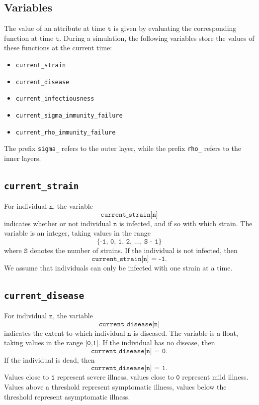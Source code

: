 \documentclass[10pt,letterpaper]{article}
\begin{document}
\subsection*{Variables}
The value of an attribute at time $\texttt{t}$ is given by evaluating the corresponding function at time $\texttt{t}$. During a simulation, the following variables store the values of these functions at the current time:
\begin{itemize}
\item \texttt{current{\_}strain}
\item \texttt{current{\_}disease}
\item \texttt{current{\_}infectiousness}
\item \texttt{current{\_}sigma{\_}immunity{\_}failure}
\item \texttt{current{\_}rho{\_}immunity{\_}failure}
\end{itemize}
The prefix \texttt{sigma{\_}} refers to the outer layer, while the prefix \texttt{rho{\_}} refers to the inner layers.

\subsection*{\texttt{current{\_}strain}}
For individual $\texttt{n}$, the variable $$\texttt{current{\_}strain[n]}$$ indicates whether or not individual $\texttt{n}$ is infected, and if so with which strain. The variable is an integer, taking values in the range $$\texttt{\{-1, 0, 1, 2, \ldots, S - 1\}}$$ where $\texttt{S}$ denotes the number of strains. If the individual is not infected, then $$\texttt{current{\_}strain[n] = -1}.$$ We assume that individuals can only be infected with one strain at a time.

\subsection*{\texttt{current{\_}disease}}
For individual $\texttt{n}$, the variable $$\texttt{current{\_}disease[n]}$$ indicates the extent to which individual $\texttt{n}$ is diseased. The variable is a float, taking values in the range $\texttt{[0,1]}.$ If the individual has no disease, then $$\texttt{current{\_}disease[n] = 0}.$$ If the individual is dead, then $$\texttt{current{\_}disease[n] = 1}.$$ Values close to $\texttt{1}$ represent severe illness, values close to $\texttt{0}$ represent mild illness. Values above a threshold represent symptomatic illness, values below the threshold represent asymptomatic illness. 
\end{document}
